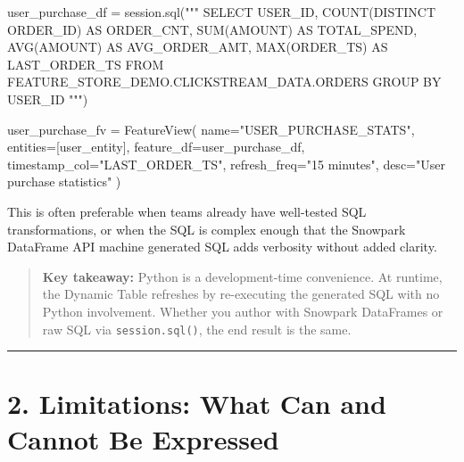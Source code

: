 \documentclass[
  letterpaper,
  DIV=11,
  numbers=noendperiod]{scrreprt}
\newenvironment{Shaded}{\begin{snugshade}}{\end{snugshade}}
\newcommand{\NormalTok}[1]{\textcolor[rgb]{0.00,0.23,0.31}{#1}}
\newcommand{\OperatorTok}[1]{\textcolor[rgb]{0.37,0.37,0.37}{#1}}
\newcommand{\StringTok}[1]{\textcolor[rgb]{0.13,0.47,0.30}{#1}}
\begin{document}
\begin{Shaded}
\begin{Highlighting}[]
\NormalTok{user\_purchase\_df }\OperatorTok{=}\NormalTok{ session.sql(}\StringTok{"""}
\StringTok{    SELECT USER\_ID,}
\StringTok{           COUNT(DISTINCT ORDER\_ID) AS ORDER\_CNT,}
\StringTok{           SUM(AMOUNT)              AS TOTAL\_SPEND,}
\StringTok{           AVG(AMOUNT)              AS AVG\_ORDER\_AMT,}
\StringTok{           MAX(ORDER\_TS)            AS LAST\_ORDER\_TS}
\StringTok{    FROM FEATURE\_STORE\_DEMO.CLICKSTREAM\_DATA.ORDERS}
\StringTok{    GROUP BY USER\_ID}
\StringTok{"""}\NormalTok{)}

\NormalTok{user\_purchase\_fv }\OperatorTok{=}\NormalTok{ FeatureView(}
\NormalTok{    name}\OperatorTok{=}\StringTok{"USER\_PURCHASE\_STATS"}\NormalTok{,}
\NormalTok{    entities}\OperatorTok{=}\NormalTok{[user\_entity],}
\NormalTok{    feature\_df}\OperatorTok{=}\NormalTok{user\_purchase\_df,}
\NormalTok{    timestamp\_col}\OperatorTok{=}\StringTok{"LAST\_ORDER\_TS"}\NormalTok{,}
\NormalTok{    refresh\_freq}\OperatorTok{=}\StringTok{"15 minutes"}\NormalTok{,}
\NormalTok{    desc}\OperatorTok{=}\StringTok{"User purchase statistics"}
\NormalTok{)}
\end{Highlighting}
\end{Shaded}

This is often preferable when teams already have well-tested SQL
transformations, or when the SQL is complex enough that the Snowpark
DataFrame API machine generated SQL adds verbosity without added
clarity.

\begin{quote}
\textbf{Key takeaway:} Python is a development-time convenience. At
runtime, the Dynamic Table refreshes by re-executing the generated SQL
with no Python involvement. Whether you author with Snowpark DataFrames
or raw SQL via \texttt{session.sql()}, the end result is the same.
\end{quote}

\begin{center}\rule{0.5\linewidth}{0.5pt}\end{center}

\hypertarget{limitations-what-can-and-cannot-be-expressed}{%
\section{2. Limitations: What Can and Cannot Be
Expressed}\label{limitations-what-can-and-cannot-be-expressed}}
\end{document}
